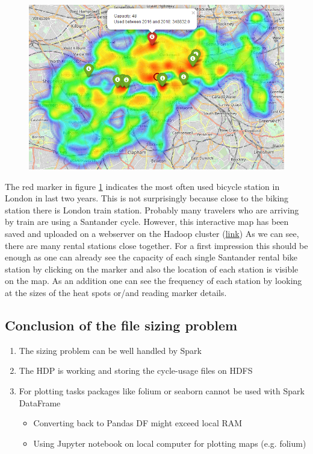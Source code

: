 \begin{figure}[H]
\hspace{-0.8cm}
\includegraphics[width=1.1\textwidth]{img/heat}\label{pic:heat}
\label{pic:heat}
\end{figure}
\noindent 
The red marker in figure \ref{pic:heat} indicates the most often used bicycle station in London in last two years. This is not surprisingly because close to the biking station there is London train station. Probably many travelers who are arriving by train are using a Santander cycle. However, this interactive map has been saved and uploaded on a webserver on the Hadoop cluster (\href{http://i-hadoop-01.informatik.hs-ulm.de/most_stations.html}{link})
As we can see, there are many rental stations close together. For a first impression this should be enough
as one can already see the capacity of each single Santander rental bike station by clicking on the marker
and also the location of each station is visible on the map. As an addition one can see the frequency of
each station by looking at the sizes of the heat spots or/and reading marker details.
\subsection{Conclusion of the file sizing problem}
\begin{enumerate}
\item The sizing problem can be well handled by Spark
\item The HDP is working and storing the cycle-usage files on HDFS
\item For plotting tasks packages like folium or seaborn cannot be used with Spark DataFrame
\begin{itemize}
\item Converting back to Pandas DF might exceed local RAM
\item Using Jupyter notebook on local computer for plotting maps (e.g. folium)
\end{itemize}
\end{enumerate}
